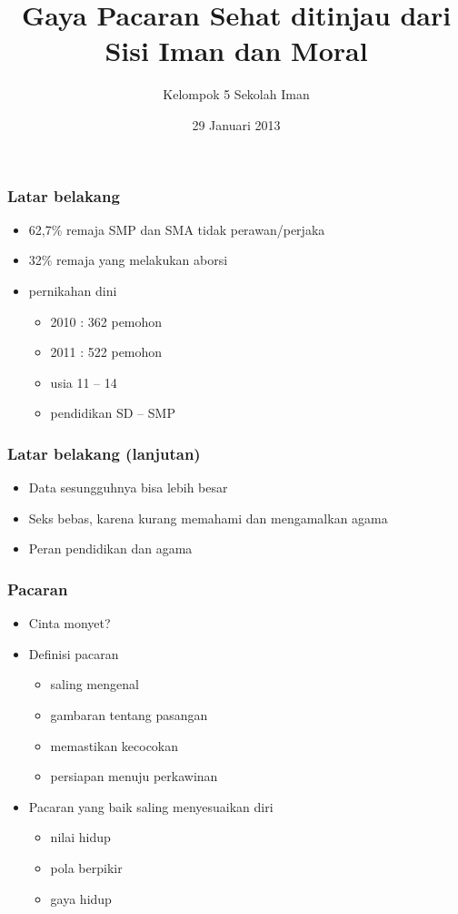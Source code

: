 \documentclass[12pt,a4paper]{beamer}
\title{Gaya Pacaran Sehat ditinjau dari Sisi Iman dan Moral}
\author{Kelompok 5 Sekolah Iman}
\date{29 Januari 2013}
\begin{document}
\maketitle
\begin{frame}
\frametitle{Latar belakang}
\begin{itemize}[<+->]
\item 62,7\% remaja SMP dan SMA tidak perawan/perjaka
\item 32\% remaja yang melakukan aborsi
\item pernikahan dini
\begin{itemize}[<+->]
\item 2010 : 362 pemohon
\item 2011 : 522 pemohon
\item usia 11 -- 14
\item pendidikan SD -- SMP
\end{itemize}

\end{itemize}
\end{frame}

\begin{frame}
\frametitle{Latar belakang (lanjutan)}
\begin{itemize}[<+->]
\item Data sesungguhnya bisa lebih besar
\item Seks bebas, karena kurang memahami dan mengamalkan agama
\item Peran pendidikan dan agama 
\end{itemize}
\end{frame}


\begin{frame}
\frametitle{Pacaran}
\begin{itemize}[<+->]
\item Cinta monyet?
\item Definisi pacaran
\begin{itemize}[<+->]
\item saling mengenal
\item gambaran tentang pasangan
\item memastikan kecocokan
\item persiapan menuju perkawinan
\end{itemize}
\item Pacaran yang baik saling menyesuaikan diri
\begin{itemize}[<+->]
\item nilai hidup
\item pola berpikir
\item gaya hidup
\end{itemize}
\end{itemize}
\end{frame}
\end{document}

